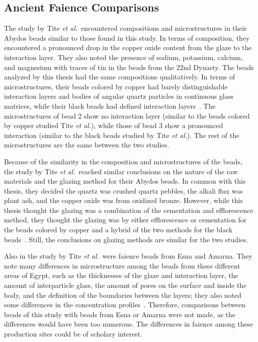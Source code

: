 \subsection{Ancient Faience Comparisons}

The study by Tite \emph{et al.}\ encountered compositions and microstructures in their Abydos beads similar to those found in this study. In terms of composition, they encountered a pronounced drop in the copper oxide content from the glaze to the interaction layer. They also noted the presence of sodium, potassium, calcium, and magnesium with traces of tin in the beads from the 22nd Dynasty. The beads analyzed by this thesis had the same compositions qualitatively. In terms of microstructures, their beads colored by copper had barely distinguishable interaction layers and bodies of angular quartz particles in continuous glass matrices, while their black beads had defined interaction layers~\cite{tite07}. The microstructures of bead 2 show no interaction layer (similar to the beads colored by copper studied Tite \emph{et al.}), while those of bead 3 show a pronounced interaction (similar to the black beads studied by Tite \emph{et al.}). The rest of the microstructures are the same between the two studies.

Because of the similarity in the composition and microstructures of the beads, the study by Tite \emph{et al.}\ reached similar conclusions on the nature of the raw materials and the glazing method for their Abydos beads. In common with this thesis, they decided the quartz was crushed quartz pebbles, the alkali flux was plant ash, and the copper oxide was from oxidized bronze. However, while this thesis thought the glazing was a combination of the cementation and efflorescence method, they thought the glazing was by either efflorescence or cementation for the beads colored by copper and a hybrid of the two methods for the black beads~\cite{tite07}. Still, the conclusions on glazing methods are similar for the two studies.

Also in the study by Tite \emph{et al.}\ were faience beads from Esna and Amarna. They note many differences in microstructure among the beads from these different areas of Egypt, such as the thicknesses of the glaze and interaction layer, the amount of interparticle glass, the amount of pores on the surface and inside the body, and the definition of the boundaries between the layers; they also noted some differences in the concentration profiles~\cite{tite07}. Therefore, comparisons between beads of this study with beads from Esna or Amarna were not made, as the differences would have been too numerous. The differences in faience among these production sites could be of scholary interest.

